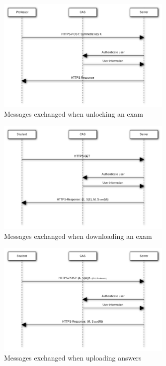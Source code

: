 \documentclass{article}
\begin{document}
\begin{figure}
\begin{center}
\includegraphics[width=0.75\textwidth]{images/unlock_exam.pdf}
\caption{Messages exchanged when unlocking an exam}
\label{fig:unlock-exam}
\end{center}
\end{figure}

\begin{figure}
\begin{center}
\includegraphics[width=0.75\textwidth]{images/download_exam.pdf}
\caption{Messages exchanged when downloading an exam}
\label{fig:download-exam}
\end{center}
\end{figure}

\begin{figure}
\begin{center}
\includegraphics[width=0.75\textwidth]{images/upload_answers.pdf}
\caption{Messages exchanged when uploading answers}
\label{fig:upload-answers}
\end{center}
\end{figure}
\end{document}
